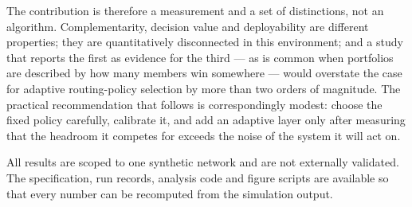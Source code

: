 The contribution is therefore a measurement and a set of distinctions, not an
algorithm. Complementarity, decision value and deployability are different
properties; they are quantitatively disconnected in this environment; and a study
that reports the first as evidence for the third --- as is common when portfolios
are described by how many members win somewhere --- would overstate the case for
adaptive routing-policy selection by more than two orders of magnitude. The
practical recommendation that follows is correspondingly modest: choose the fixed
policy carefully, calibrate it, and add an adaptive layer only after measuring
that the headroom it competes for exceeds the noise of the system it will act on.

All results are scoped to one synthetic network and are not externally validated.
The specification, run records, analysis code and figure scripts are available so
that every number can be recomputed from the simulation output.
